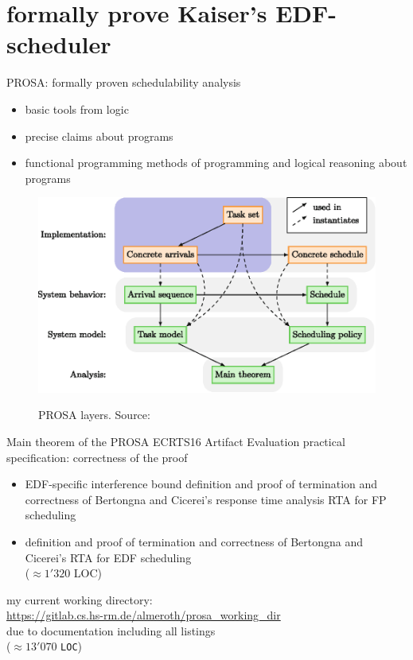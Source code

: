 \documentclass{beamer}
\begin{document}
	 

	\section{formally prove Kaiser's EDF-scheduler}
	
	
	\begin{frame}{PROSA: formally proven schedulability analysis}
		\begin{itemize}
			\item basic tools from logic
			\item precise claims about programs
			\item functional programming methods of programming and logical reasoning about programs
		 \end{itemize}		  
		 \begin{figure}[h]
					\includegraphics[width=.6\textwidth]{PROSALayers.eps}
					\label{fig:screenshot-proof-general}
					\caption{PROSA layers. Source: \cite{certikos_formal_schedulability}}
		 \end{figure}    		 
      \end{frame}		  
		  
	

      
		\begin{frame}{Main theorem of the PROSA ECRTS16 Artifact Evaluation}
		 practical specification: correctness of the proof 	   
		 \begin{itemize}
	 		\item EDF-specific interference bound definition and proof of termination and correctness  of Bertongna and Cicerei's response time analysis RTA for FP scheduling
			\item \alert{definition} \alert{and} \alert{proof} \alert{of} \alert{termination} \alert{and} \alert{correctness} \alert{of} \alert{Bertongna} \alert{and} \alert{Cicerei's} \alert{RTA} \alert{for} \alert{EDF} \alert{scheduling} \\ \alert{($\approx 1'320$ LOC)}    	   
			\end{itemize}   	
			my current working directory:\\
			\url{https://gitlab.cs.hs-rm.de/almeroth/prosa_working_dir}\\
			due to documentation including all listings\\
			($\approx 13'070$ \texttt{LOC})	
 	\end{frame}
\end{document}

